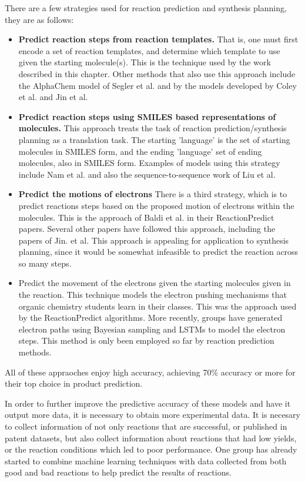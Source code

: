There are a few strategies used for reaction prediction and synthesis planning, they are as follows: 

\begin{itemize}
\item \textbf{Predict reaction steps from reaction templates.} That is, one must first encode a set of reaction templates, and determine which template to use given the starting molecule(s). This is the technique used by the work described in this chapter. 
Other methods that also use this approach include the AlphaChem model of Segler et al.\cite{segler2018planning,segler2017towards} and by the models developed by Coley et al. and Jin et al.\cite{Jin_2017_WLN, coley2017prediction} 

\item \textbf{Predict reaction steps using SMILES based representations of molecules.} This approach treats the task of reaction prediction/synthesis planning as a translation task. The starting 'language' is the set of starting molecules in SMILES form, and the ending 'language' set of ending molecules, also in SMILES form.
Examples of models using this strategy include Nam et al.\cite{Nam_2016_Translation} and also the sequence-to-sequence work of Liu et al.\cite{liu2017retrosynthetic} 

\item \textbf{Predict the motions of electrons}
There is a third strategy, which is to predict reactions steps based on the proposed motion of electrons within the molecules. This is the approach of Baldi et al. in their ReactionPredict papers. Several other papers have followed this approach, including the papers of Jin. et al. This approach is appealing for application to synthesis planning, since it would be somewhat infeasible to predict the reaction across so many steps.
\item Predict the movement of the electrons given the starting molecules given in the reaction. This technique models the electron pushing mechanisms that organic chemistry students learn in their classes. This was the approach used by the ReactionPredict algorithms\cite{Baldi2009NoElectron,Kayala2011Learning,Chen2008SynExplorer}. More recently, groups have generated electron paths using Bayesian sampling and LSTMs to model the electron steps.\cite{bradshaw2018predicting,fooshee2018deep} This method is only been employed so far by reaction prediction methods. 
\end{itemize}

All of these appraoches enjoy high accuracy, achieving 70\% accuracy or more for their top choice in product prediction.

In order to further improve the predictive accuracy of these models and have it output more data, it is necessary to obtain more experimental data. It is necesary to collect information of not only reactions that are successful, or published in patent datasets, but also collect information about reactions that had low yields, or the reaction conditions which led to poor performance. One group has already started to combine machine learning techniques with data collected from both good and bad reactions to help predict the results of reactions\cite{ahneman2018predicting, raccuglia2016machine}.


